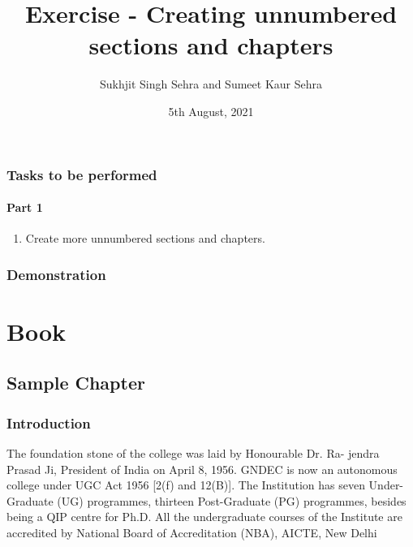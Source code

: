 \documentclass[a4paper,12pt,twoside]{book}
\title{Exercise - Creating  unnumbered sections and chapters}
\author{Sukhjit Singh Sehra and Sumeet Kaur Sehra}
\date{5th August, 2021}
\begin{document}
	\maketitle	
	\section*{Tasks to be performed}
	\subsection*{Part 1}
	\begin{enumerate}	
		\item Create more unnumbered sections and chapters.
	\end{enumerate}
	\section*{Demonstration}
	\part*{Book}
\chapter*{Sample Chapter}
\section*{Introduction}
The foundation stone of the college was laid by Honourable Dr. Ra-
jendra Prasad Ji, President of India on April 8, 1956. GNDEC is now an
autonomous college under UGC Act 1956 [2(f) and 12(B)]. The Institution
has seven Under-Graduate (UG) programmes, thirteen Post-Graduate (PG)
programmes, besides being a QIP centre for Ph.D. All the undergraduate
courses of the Institute are accredited by National Board of Accreditation
(NBA), AICTE, New Delhi
\end{document}
